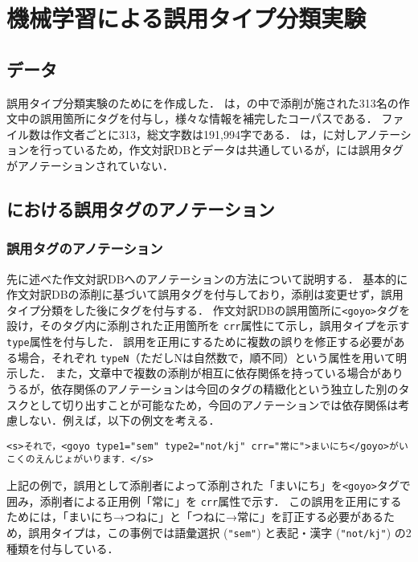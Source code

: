\documentclass[japanese]{jnlp_1.4}
\renewenvironment{quote}{}{}
\newcommand{\ty}{}
\newcommand{\ngc}{}
\begin{document}
\section{機械学習による誤用タイプ分類実験}

\subsection{データ}

誤用タイプ分類実験のために\ngc\hbox{}を作成した．
\ngc\hbox{}は，\ty\hbox{}の中で添削が施された313名の作文中の誤用箇所にタグを付与し，様々な情報を補完したコーパスである\cite{oyamaj/09,oyamaj/12}．
ファイル数は作文者ごとに313，総文字数は191,994字である．
\ngc\hbox{}は，\ty\hbox{}に対しアノテーションを行っているため，作文対訳DBとデータは共通しているが，\ty\hbox{}には誤用タグがアノテーションされていない．


\subsection{\ngc\hbox{}における誤用タグのアノテーション}

\subsubsection{誤用タグのアノテーション}

先に述べた作文対訳DBへのアノテーションの方法について説明する．
基本的に作文対訳DBの添削に基づいて誤用タグを付与しており，添削は変更せず，誤用タイプ分類をした後にタグを付与する．
作文対訳DBの誤用箇所に\verb|<goyo>|タグを設け，そのタグ内に添削された正用箇所を \verb|crr|属性にて示し，誤用タイプを示す \verb|type|属性を付与した．
誤用を正用にするために複数の誤りを修正する必要がある場合，それぞれ \verb|typeN|（ただしNは自然数で，順不同）という属性を用いて明示した．
また，文章中で複数の添削が相互に依存関係を持っている場合がありうるが，依存関係のアノテーションは今回のタグの精緻化という独立した別のタスクとして切り出すことが可能なため，今回のアノテーションでは依存関係は考慮しない．例えば，以下の例文を考える．

\begin{quote}
\begin{verbatim}
<s>それで，<goyo type1="sem" type2="not/kj" crr="常に">まいにち</goyo>がいこくのえんじょがいります．</s>
\end{verbatim}
\end{quote}

上記の例で，誤用として添削者によって添削された「まいにち」を\verb|<goyo>|タグで囲み，添削者による正用例「常に」を \verb|crr|属性で示す．
この誤用を正用にするためには，「まいにち→つねに」と「つねに→常に」を訂正する必要があるため，誤用タイプは，この事例では語彙選択 (\verb|"sem"|) と表記・漢字 (\verb|"not/kj"|) の2種類を付与している．
\end{document}
